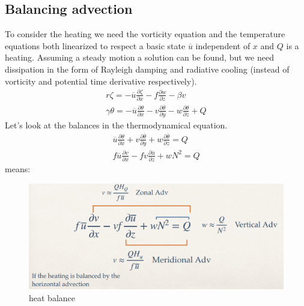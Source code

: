 \subsection{Balancing advection}
To consider the heating we need the vorticity equation and the temperature equations both linearized to respect a basic state $\overline{u}$ independent of $x$ and $Q$ is a heating. Assuming a steady motion a solution can be found, but we need dissipation in the form of Rayleigh damping and radiative cooling (instead of vorticity and potential time derivative respectively).
\begin{align}
	r\zeta=-\overline{u}\frac{\partial\zeta}{\partial x}-f\frac{\partial w}{\partial z}-\beta v \\
	\gamma\theta=-\overline{u}\frac{\partial\theta}{\partial x}-v\frac{\partial\overline{\theta}}{\partial y}-w\frac{\partial\theta}{\partial z}+Q
\end{align}
Let's look at the balances in the thermodynamical equation.
\begin{align}
	\overline{u}\frac{\partial\theta}{\partial x}+{v}\frac{\partial\overline{\theta}}{\partial y}+w\frac{\partial\overline{\theta}}{\partial z}=Q \\
	f\overline{u}\frac{\partial v}{\partial x}-f{v}\frac{\partial\overline{u}}{\partial z}+wN^2=Q
\end{align}
means:
\begin{figure}[htp!]
	\centering
	\includegraphics[width=0.5\linewidth]{upload/Screenshot 2024-11-26 104817.png}
	\caption{heat balance}
\end{figure}

